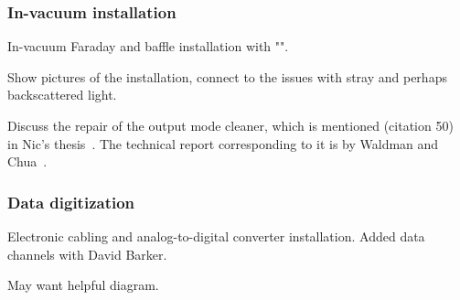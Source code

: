             \subsubsection{In-vacuum installation}
            \label{In-vacuum}

                In-vacuum Faraday and baffle installation with "".

                Show pictures of the installation, connect to the issues with stray and perhaps backscattered light.

		Discuss the repair of the output mode cleaner, which is mentioned (citation 50) in Nic's thesis~\cite{SmithThesis}. The technical report corresponding to it is by Waldman and Chua~\cite{Waldman2011}.

            \subsubsection{Data digitization}
            \label{data_digitization}

                Electronic cabling and analog-to-digital converter installation.
                Added data channels with David Barker.

		May want helpful diagram.






